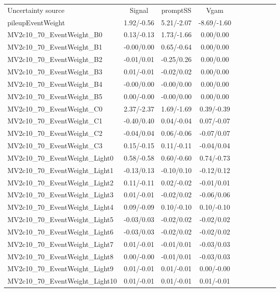 \begin{table}[h]
\scriptsize
\begin{center}
\begin{tabular}{l|ccccccccc}
\hline
\hline
Uncertainty source &Signal &promptSS &Vgam \\
pileupEventWeight &1.92/-0.56 &5.21/-2.07 &-8.69/-1.60 \\
MV2c10\_70\_EventWeight\_B0 &0.13/-0.13 &1.73/-1.66 &0.00/0.00 \\
MV2c10\_70\_EventWeight\_B1 &-0.00/0.00 &0.65/-0.64 &0.00/0.00 \\
MV2c10\_70\_EventWeight\_B2 &-0.01/0.01 &-0.25/0.26 &0.00/0.00 \\
MV2c10\_70\_EventWeight\_B3 &0.01/-0.01 &-0.02/0.02 &0.00/0.00 \\
MV2c10\_70\_EventWeight\_B4 &-0.00/0.00 &-0.00/0.00 &0.00/0.00 \\
MV2c10\_70\_EventWeight\_B5 &0.00/-0.00 &-0.00/0.00 &0.00/0.00 \\
MV2c10\_70\_EventWeight\_C0 &2.37/-2.37 &1.69/-1.69 &0.39/-0.39 \\
MV2c10\_70\_EventWeight\_C1 &-0.40/0.40 &0.04/-0.04 &0.07/-0.07 \\
MV2c10\_70\_EventWeight\_C2 &-0.04/0.04 &0.06/-0.06 &-0.07/0.07 \\
MV2c10\_70\_EventWeight\_C3 &0.15/-0.15 &0.11/-0.11 &-0.04/0.04 \\
MV2c10\_70\_EventWeight\_Light0 &0.58/-0.58 &0.60/-0.60 &0.74/-0.73 \\
MV2c10\_70\_EventWeight\_Light1 &-0.13/0.13 &-0.10/0.10 &-0.12/0.12 \\
MV2c10\_70\_EventWeight\_Light2 &0.11/-0.11 &0.02/-0.02 &-0.01/0.01 \\
MV2c10\_70\_EventWeight\_Light3 &0.01/-0.01 &-0.02/0.02 &-0.06/0.06 \\
MV2c10\_70\_EventWeight\_Light4 &0.09/-0.09 &0.10/-0.10 &0.10/-0.10 \\
MV2c10\_70\_EventWeight\_Light5 &-0.03/0.03 &-0.02/0.02 &-0.02/0.02 \\
MV2c10\_70\_EventWeight\_Light6 &-0.03/0.03 &-0.02/0.02 &-0.02/0.02 \\
MV2c10\_70\_EventWeight\_Light7 &0.01/-0.01 &-0.01/0.01 &-0.03/0.03 \\
MV2c10\_70\_EventWeight\_Light8 &0.00/-0.00 &-0.01/0.01 &-0.03/0.03 \\
MV2c10\_70\_EventWeight\_Light9 &0.01/-0.01 &0.01/-0.01 &0.00/-0.00 \\
MV2c10\_70\_EventWeight\_Light10 &0.01/-0.01 &0.01/-0.01 &0.01/-0.01 \\

\end{tabular}
\end{center}
\end{table}
